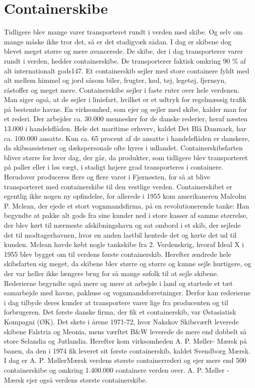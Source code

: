 \part{Containerskibe}\label{containerskibe}

Tidligere blev mange varer transporteret rundt i verden med skibe. Og
selv om mange måske ikke tror det, så er det stadigvæk sådan. I dag er
skibene dog blevet meget større og mere avancerede. De skibe, der i dag
transporterer varer rundt i verden, hedder containerskibe. De
transporterer faktisk omkring 90 \% af alt internationalt gods147. Et
containerskib sejler med store containere fyldt med alt mellem himmel og
jord såsom biler, frugter, kød, tøj, legetøj, fjernsyn, råstoffer og
meget mere. Containerskibe sejler i faste ruter over hele verdenen. Man
siger også, at de sejler i liniefart, hvilket er et udtryk for
regelmæssig trafik på bestemte havne. En virksomhed, som ejer og sejler
med skibe, kalder man for et rederi. Der arbejder ca. 30.000 mennesker
for de danske rederier, heraf næsten 13.000 i handelsflåden. Hele det
maritime erhverv, kaldet Det Blå Danmark, har ca. 100.000 ansatte. Kun
ca. 65 procent af de ansatte i handelsflåden er danskere, da
skibsassistener og dækspersonale ofte hyres i udlandet.
Containerskibsfarten bliver større for hver dag, der går, da produkter,
som tidligere blev transporteret på paller eller i løs vægt, i stadigt
højere grad transporteres i containere. Herudover produceres flere og
flere varer i Fjernøsten, for så at blive transporteret med
containerskibe til den vestlige verden. Containerskibet er egentlig ikke
nogen ny opfindelse, for allerede i 1955 kom amerikaneren Malcolm P.
Mclean, der ejede et stort vognmandsfirma, på en revolutionerende tanke:
Han begyndte at pakke alt gods fra sine kunder ned i store kasser af
samme størrelse, der blev kørt til nærmeste afskibningshavn og sat
ombord i et skib, der sejlede det til modtagerhavnen, hvor en anden
lastbil hentede det og kørte det ud til kunden. Mclean havde købt nogle
tankskibe fra 2. Verdenskrig, hvoraf Ideal X i 1955 blev bygget om til
verdens første containerskib. Herefter ændrede hele skibsfarten sig
meget, da skibene blev større og større og kunne sejle hurtigere, og der
var heller ikke længere brug for så mange søfolk til at sejle skibene.
Rederierne begyndte også mere og mere at arbejde i land og startede et
tæt samarbejde med havne, pakhuse og vognmandsforretninger. Derfor kan
rederierne i dag tilbyde deres kunder at transportere varer lige fra
producenten og til forbrugeren. Det første danske firma, der fik et
containerskib, var Østasiatisk Kompagni (ØK). Det skete i årene 1971-72,
hvor Nakskov Skibsværft leverede skibene Falstria og Meonia, mens
værftet B\&W leverede de mere end dobbelt så store Selandia og
Jutlandia. Herefter kom virksomheden A. P. Møller- Mærsk på banen, da
den i 1974 fik leveret sit første containerskib, kaldet Svendborg Mærsk.
I dag er A. P. MøllerMærsk verdens største containerrederi og ejer mere
end 500 containerskibe og omkring 1.400.000 containere verden over. A.
P. Møller - Mærsk ejer også verdens største containerskibe.
